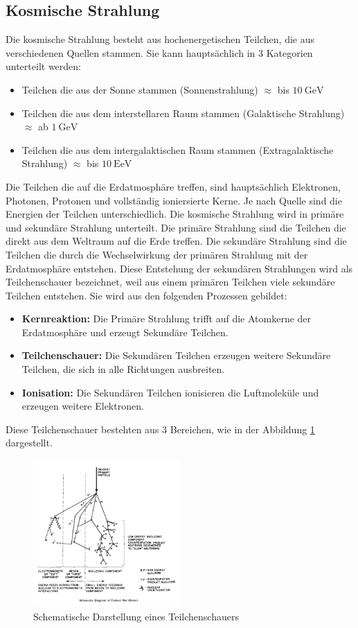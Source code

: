 \documentclass{article}
\begin{document}
\subsection{Kosmische Strahlung}
Die kosmische Strahlung besteht aus hochenergetischen Teilchen, die aus verschiedenen Quellen stammen.
Sie kann hauptsächlich in 3 Kategorien unterteilt werden:
\begin{itemize}
    \item Teilchen die aus der Sonne stammen (Sonnenstrahlung) $\approx$ bis $\SI{10}{\giga\electronvolt}$
    \item Teilchen die aus dem interstellaren Raum stammen (Galaktische Strahlung) $\approx$ ab $\SI{1}{\giga\electronvolt}$ 
    \item Teilchen die aus dem intergalaktischen Raum stammen (Extragalaktische Strahlung)  $\approx$ bis $\SI{10}{\exa\electronvolt}$
\end{itemize}
Die Teilchen die auf die Erdatmosphäre treffen, sind hauptsächlich Elektronen, Photonen, Protonen und vollständig 
ioniersierte Kerne. Je nach Quelle sind die Energien der Teilchen unterschiedlich.
Die kosmische Strahlung wird in primäre und sekundäre Strahlung unterteilt.
Die primäre Strahlung sind die Teilchen die direkt aus dem Weltraum auf die Erde treffen.
Die sekundäre Strahlung sind die Teilchen die durch die Wechselwirkung der primären Strahlung mit der Erdatmosphäre entstehen.
Diese Entstehung der sekundären Strahlungen wird als Teilchenschauer bezeichnet, weil aus einem primären Teilchen viele sekundäre Teilchen entstehen. 
Sie wird aus den folgenden Prozessen gebildet:
\begin{itemize}
    \item \textbf{Kernreaktion:} Die Primäre Strahlung trifft auf die Atomkerne der Erdatmosphäre und erzeugt Sekundäre Teilchen.
    \item \textbf{Teilchenschauer:} Die Sekundären Teilchen erzeugen weitere Sekundäre Teilchen, die sich in alle Richtungen ausbreiten.
    \item \textbf{Ionisation:} Die Sekundären Teilchen ionisieren die Luftmoleküle und erzeugen weitere Elektronen.
\end{itemize}
Diese Teilchenschauer bestehten aus 3 Bereichen, wie in der Abbildung \ref{fig:Teilchenschauer} dargestellt.
\begin{figure}[H]
    \centering
    \includegraphics[width=0.5\textwidth]{figures/Teilchenschauer.png}
    \caption{Schematische Darstellung eines Teilchenschauers \cite{shower}}
    \label{fig:Teilchenschauer}
\end{figure}
\end{document}
